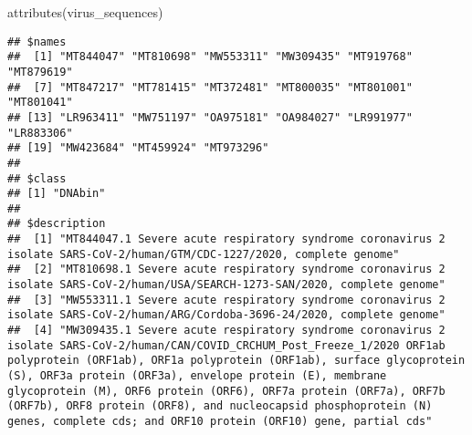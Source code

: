 \documentclass[
]{article}
\newenvironment{Shaded}{\begin{snugshade}}{\end{snugshade}}
\newcommand{\FunctionTok}[1]{\textcolor[rgb]{0.00,0.00,0.00}{#1}}
\newcommand{\NormalTok}[1]{#1}
\begin{document}
\begin{Shaded}
\begin{Highlighting}[]
\FunctionTok{attributes}\NormalTok{(virus\_sequences)}
\end{Highlighting}
\end{Shaded}

\begin{verbatim}
## $names
##  [1] "MT844047" "MT810698" "MW553311" "MW309435" "MT919768" "MT879619"
##  [7] "MT847217" "MT781415" "MT372481" "MT800035" "MT801001" "MT801041"
## [13] "LR963411" "MW751197" "OA975181" "OA984027" "LR991977" "LR883306"
## [19] "MW423684" "MT459924" "MT973296"
## 
## $class
## [1] "DNAbin"
## 
## $description
##  [1] "MT844047.1 Severe acute respiratory syndrome coronavirus 2 isolate SARS-CoV-2/human/GTM/CDC-1227/2020, complete genome"                                                                                                                                                                                                                                                                                                                                                                                                           
##  [2] "MT810698.1 Severe acute respiratory syndrome coronavirus 2 isolate SARS-CoV-2/human/USA/SEARCH-1273-SAN/2020, complete genome"                                                                                                                                                                                                                                                                                                                                                                                                    
##  [3] "MW553311.1 Severe acute respiratory syndrome coronavirus 2 isolate SARS-CoV-2/human/ARG/Cordoba-3696-24/2020, complete genome"                                                                                                                                                                                                                                                                                                                                                                                                    
##  [4] "MW309435.1 Severe acute respiratory syndrome coronavirus 2 isolate SARS-CoV-2/human/CAN/COVID_CRCHUM_Post_Freeze_1/2020 ORF1ab polyprotein (ORF1ab), ORF1a polyprotein (ORF1ab), surface glycoprotein (S), ORF3a protein (ORF3a), envelope protein (E), membrane glycoprotein (M), ORF6 protein (ORF6), ORF7a protein (ORF7a), ORF7b (ORF7b), ORF8 protein (ORF8), and nucleocapsid phosphoprotein (N) genes, complete cds; and ORF10 protein (ORF10) gene, partial cds"                                                          

\end{verbatim}
\end{document}
